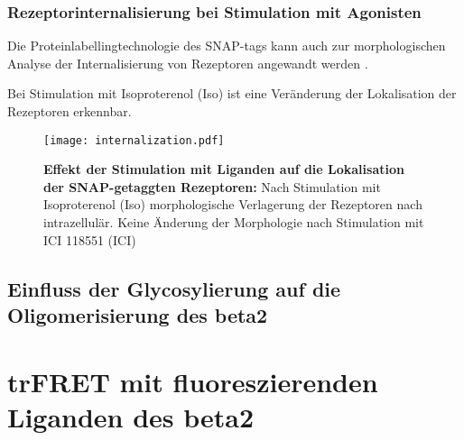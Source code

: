 \subsubsection{Rezeptorinternalisierung bei Stimulation mit Agonisten}
Die Proteinlabellingtechnologie des SNAP-tags kann auch zur morphologischen Analyse der Internalisierung von Rezeptoren angewandt werden \parencite{Koo2012}. 

Bei Stimulation mit Isoproterenol (Iso) ist eine Veränderung der Lokalisation der Rezeptoren erkennbar. 
\begin{figure}[htbp]
	\centering
    \texttt{[image: internalization.pdf]}
    \caption{\textbf{Effekt der Stimulation mit Liganden auf die Lokalisation der SNAP-getaggten Rezeptoren:} Nach Stimulation mit Isoproterenol (Iso) morphologische Verlagerung der Rezeptoren nach intrazellulär. Keine Änderung der Morphologie nach Stimulation mit ICI 118551 (ICI)} 
    \label{fig:internalization}
\end{figure}

\subsection{Einfluss der Glycosylierung auf die Oligomerisierung des \gls{beta2}}

\section{trFRET mit fluoreszierenden Liganden des \gls{beta2}}
\label{ligandenfret}

